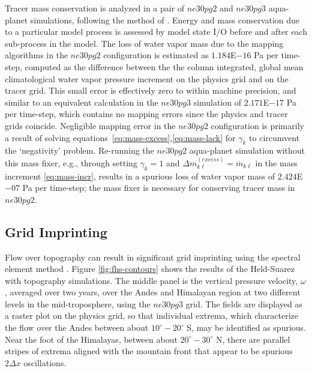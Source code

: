\documentclass{agujournal}
\begin{document}
Tracer mass conservation is analyzed in a pair of $ne30pg2$ and $ne30pg3$ aqua-planet simulations, following the method of \cite{LW2019JAMES}. Energy and mass conservation due to a particular model process is assessed by model state I/O before and after each sub-process in the model. The loss of water vapor mass due to the mapping algorithms in the $ne30pg2$ configuration is estimated as $1.184$E$-16$ Pa per time-step, computed as the difference between the the column integrated, global mean climatological water vapor pressure increment on the physics grid and on the tracer grid. This small error is effectively zero to within machine precision, and similar to an equivalent calculation in the $ne30pg3$ simulation of $2.171$E$-17$ Pa per time-step, which contains no mapping errors since the physics and tracer grids coincide. Negligible mapping error in the $ne30pg2$ configuration is primarily a result of solving equations~\eqref{eq:mass-excess},\eqref{eq:mass-lack} for $\gamma_k$ to circumvent the `negativity' problem. Re-running the $ne30pg2$ aqua-planet simulation without this mass fixer, e.g., through setting $\gamma_k=1$ and $\Delta m^{(excess)}_{k\ell} = \overline{m}_{k\ell}$ in the mass increment \eqref{eq:mass-incr}, results in a spurious loss of water vapor mass of $2.424$E$-07$ Pa per time-step; the mass fixer is necessary for conserving tracer mass in $ne30pg2$. 


\subsection{Grid Imprinting}\label{sec:hs94}

Flow over topography can result in significant grid imprinting using the spectral element method \citep[][H18]{gmdd-8-4623-2015}. Figure \ref{fig:fhs-contours} shows the results of the Held-Suarez with topography simulations. The middle panel is the vertical pressure velocity, $\omega$, averaged over two years, over the Andes and Himalayan region at two different levels in the mid-troposphere, using the $ne30pg3$ grid. The fields are displayed as a raster plot on the physics grid, so that individual extrema, which characterize the flow over the Andes between about $10^\circ-20^\circ$ S, may be identified as spurious. Near the foot of the Himalayas, between about $20^\circ-30^\circ$ N, there are parallel stripes of extrema aligned with the mountain front that appear to be spurious $2\Delta x$ oscillations.
\end{document}
